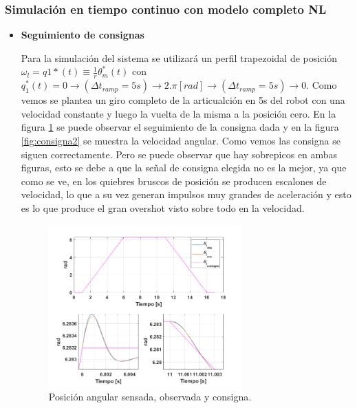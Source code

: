 \documentclass[10pt]{article}
\begin{document}
\subsubsection{Simulación en tiempo continuo con modelo completo NL}
\begin{itemize}
	\item \textbf{Seguimiento de consignas}

Para la simulación del sistema se utilizará un perfil trapezoidal 
de posición 
$\omega_{l}=q1*(t) \equiv \frac{1}{r}\theta^{*}_{m}(t)$ con $q_{1}^{*}(t)=0 \rightarrow (\Delta t_{ramp}=5s) \rightarrow 2.\pi [rad] \rightarrow (\Delta t_{ramp}=5s) \rightarrow 0$. Como vemos se plantea un giro completo de la articualción en 5s
del robot con una velocidad constante y luego la vuelta de la misma a la posición cero.
En la figura \ref{fig:consigna} se puede observar el seguimiento de la consigna dada y en la figura \ref{fig:consigna2} se muestra la velocidad angular. Como vemos las consigna se siguen correctamente.
Pero se puede observar que hay sobrepicos en ambas figuras, esto se debe a que la señal de consigna elegida no es la mejor, ya que como se ve, en los quiebres bruscos de posición
se producen escalones de velocidad, lo que a su vez generan impulsos muy grandes de aceleración y esto es lo que produce el gran overshot visto sobre todo en la velocidad.

\begin{figure}[h!]
	\centering
	\includegraphics[width=0.7\textwidth]{consigna.png}
	\caption{\label{fig:consigna}Posición angular sensada, observada y consigna.}
	\end{figure}


\end{itemize}
\end{document}
